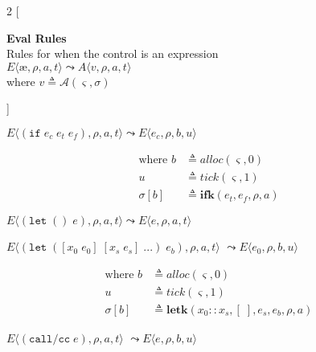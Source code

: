 \documentclass[12pt,draft]{article}
\newcommand\mae{\ensuremath{\text{\ae}}}
\newcommand{\ifsyn}[3]{(\texttt{if}\;#1\;#2\;#3)}
\newcommand{\callccsyn}[1]{(\texttt{call/cc}\;#1)}
\begin{document}
\begin{multicols*}{2}
[
\begin{center}
\textbf{Eval Rules} \\
Rules for when the control is an expression \\
\vspace{10mm}
$E\langle \mae , \rho , a , t \rangle
\leadsto
A\langle v , \rho , a , t \rangle$ \\
where $v \triangleq \mathcal{A}(\varsigma, \sigma)$
\end{center}
]
\begin{center}
  $E\langle \ifsyn{e_c}{e_t}{e_f} , \rho , a , t \rangle
  \leadsto
  E\langle e_c , \rho , b , u \rangle$
\end{center}
\vspace{-7mm}
\begin{align*}
\text{where } b &\triangleq alloc(\varsigma, 0) \\
u &\triangleq tick(\varsigma, 1) \\
\sigma[b] &\triangleq \textbf{ifk}(e_t, e_f, \rho, a)
\end{align*}
\begin{center}
  $E\langle (\texttt{let}\;()\;e) , \rho , a , t \rangle
  \leadsto
  E\langle e , \rho , a , t \rangle$
\end{center}
\begin{center}
  $E\langle
  (\texttt{let}\;([x_0\;e_0]\;[x_s\;e_s]\;...)\;e_b) , \rho , a , t
  \rangle$
  $\leadsto E\langle e_0 , \rho , b , u \rangle$
\end{center}
\vspace{-7mm}
\begin{align*}
\text{where } b &\triangleq alloc(\varsigma, 0) \\
u &\triangleq tick(\varsigma, 1) \\
\sigma[b] &\triangleq \textbf{letk}(x_0::x_s, [\;], e_s, e_b, \rho, a)
\end{align*}
\begin{center}
  $E\langle \callccsyn{e} , \rho , a , t \rangle$
  $\leadsto E\langle e , \rho , b , u \rangle$
\end{center}
\vspace{-7mm}

\end{multicols*}
\end{document}
